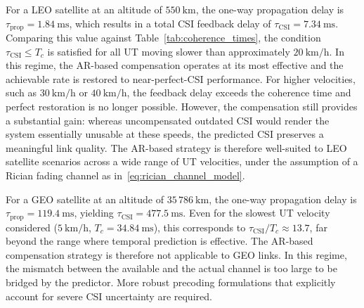 For a \ac{LEO} satellite at an altitude of $550~\mathrm{km}$, the one-way propagation delay is $\tau_{\mathrm{prop}} = 1.84~\mathrm{ms}$, which results in a total \ac{CSI} feedback delay of $\tau_{\mathrm{CSI}} = 7.34~\mathrm{ms}$.
Comparing this value against Table~\ref{tab:coherence_times}, the condition $\tau_{\mathrm{CSI}} \leq T_c$ is satisfied for all \ac{UT} moving slower than approximately $20~\mathrm{km/h}$.
In this regime, the \ac{AR}-based compensation operates at its most effective and the achievable rate is restored to near-perfect-\ac{CSI} performance.
For higher velocities, such as $30~\mathrm{km/h}$ or $40~\mathrm{km/h}$, the feedback delay exceeds the coherence time and perfect restoration is no longer possible.
However, the compensation still provides a substantial gain: whereas uncompensated outdated \ac{CSI} would render the system essentially unusable at these speeds, the predicted \ac{CSI} preserves a meaningful link quality.
The \ac{AR}-based strategy is therefore well-suited to \ac{LEO} satellite scenarios across a wide range of \ac{UT} velocities, under the assumption of a Rician fading channel as in~\ref{eq:rician_channel_model}.

For a \ac{GEO} satellite at an altitude of $35\,786~\mathrm{km}$, the one-way propagation delay is $\tau_{\mathrm{prop}} = 119.4~\mathrm{ms}$, yielding $\tau_{\mathrm{CSI}} = 477.5~\mathrm{ms}$.
Even for the slowest \ac{UT} velocity considered ($5~\mathrm{km/h}$, $T_c = 34.84~\mathrm{ms}$), this corresponds to $\tau_{\mathrm{CSI}} / T_c \approx 13.7$, far beyond the range where temporal prediction is effective.
The \ac{AR}-based compensation strategy is therefore not applicable to \ac{GEO} links.
In this regime, the mismatch between the available and the actual channel is too large to be bridged by the predictor.
More robust precoding formulations that explicitly account for severe \ac{CSI} uncertainty are required.
